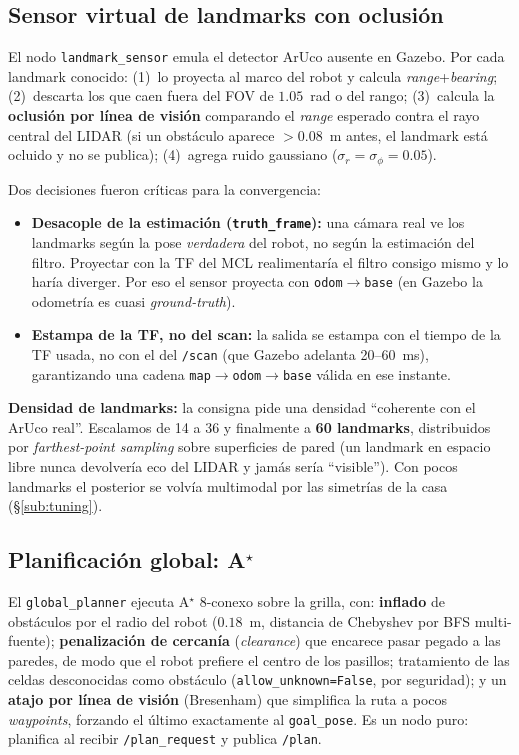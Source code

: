 \subsection{Sensor virtual de landmarks con oclusión}
El nodo \texttt{landmark\_sensor} emula el detector ArUco ausente en Gazebo. Por cada landmark conocido: (1)~lo proyecta al marco del robot y calcula \emph{range}+\emph{bearing}; (2)~descarta los que caen fuera del FOV de $1.05$~rad o del rango; (3)~calcula la \textbf{oclusión por línea de visión} comparando el \emph{range} esperado contra el rayo central del LIDAR (si un obstáculo aparece $>0.08$~m antes, el landmark está ocluido y no se publica); (4)~agrega ruido gaussiano ($\sigma_r=\sigma_\phi=0.05$).

Dos decisiones fueron críticas para la convergencia:
\begin{itemize}
\item \textbf{Desacople de la estimación (\texttt{truth\_frame}):} una cámara real ve los landmarks según la pose \emph{verdadera} del robot, no según la estimación del filtro. Proyectar con la TF del MCL realimentaría el filtro consigo mismo y lo haría diverger. Por eso el sensor proyecta con \texttt{odom$\to$base} (en Gazebo la odometría es cuasi \emph{ground-truth}).
\item \textbf{Estampa de la TF, no del scan:} la salida se estampa con el tiempo de la TF usada, no con el del \texttt{/scan} (que Gazebo adelanta 20--60~ms), garantizando una cadena \texttt{map$\to$odom$\to$base} válida en ese instante.
\end{itemize}

\textbf{Densidad de landmarks:} la consigna pide una densidad ``coherente con el ArUco real''. Escalamos de 14 a 36 y finalmente a \textbf{60 landmarks}, distribuidos por \emph{farthest-point sampling} sobre superficies de pared (un landmark en espacio libre nunca devolvería eco del LIDAR y jamás sería ``visible''). Con pocos landmarks el posterior se volvía multimodal por las simetrías de la casa (§\ref{sub:tuning}).

\subsection{Planificación global: A$^\star$}
El \texttt{global\_planner} ejecuta A$^\star$ 8-conexo \cite{astar} sobre la grilla, con: \textbf{inflado} de obstáculos por el radio del robot ($0.18$~m, distancia de Chebyshev por BFS multi-fuente); \textbf{penalización de cercanía} (\emph{clearance}) que encarece pasar pegado a las paredes, de modo que el robot prefiere el centro de los pasillos; tratamiento de las celdas desconocidas como obstáculo (\texttt{allow\_unknown=False}, por seguridad); y un \textbf{atajo por línea de visión} (Bresenham) que simplifica la ruta a pocos \emph{waypoints}, forzando el último exactamente al \texttt{goal\_pose}. Es un nodo puro: planifica al recibir \texttt{/plan\_request} y publica \texttt{/plan}.


